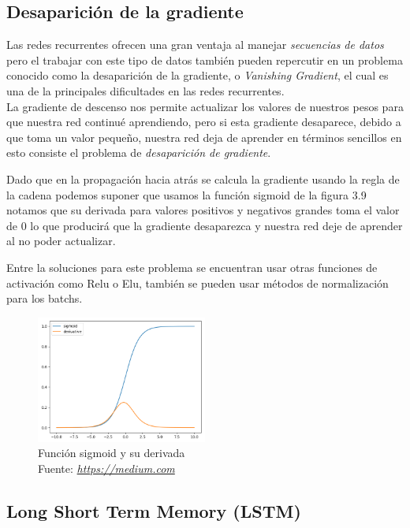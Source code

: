 \subsection{Desaparición de la gradiente}
Las redes recurrentes ofrecen una gran ventaja al manejar \textit{secuencias de datos} pero el trabajar con este tipo de datos también pueden repercutir en un problema conocido como la desaparición de la gradiente, o \textit{Vanishing Gradient}, el cual es una de la principales dificultades en las redes recurrentes.\\
 La gradiente de descenso nos permite actualizar los valores de nuestros pesos para que nuestra red continué aprendiendo, pero si esta gradiente desaparece, debido a que toma un valor pequeño, nuestra red deja de aprender en términos sencillos en esto consiste el problema de \textit{desaparición de gradiente}.

Dado que en la propagación hacia atrás se calcula la gradiente usando la regla de la cadena podemos suponer que usamos la función sigmoid de la figura 3.9 notamos que su derivada para valores positivos y negativos grandes toma el valor de 0 lo que producirá que la gradiente desaparezca y nuestra red deje de aprender al no poder actualizar.

Entre la soluciones para este problema se encuentran usar otras funciones de activación como Relu o Elu, también se pueden usar métodos de normalización para los batchs.
\begin{figure}[H]
	\centering
	\includegraphics[width=0.5\textwidth]{Figures/sigmoid.png}
	\caption{Función sigmoid y su derivada \\ Fuente:  \href{https://cdn-images-1.medium.com/max/960/1*XB5c4rTCSeFQrK0aFC5IVw.png}{\textit{https://medium.com}}}
	\label{}
\end{figure}

\subsection{Long Short Term Memory (LSTM)}

